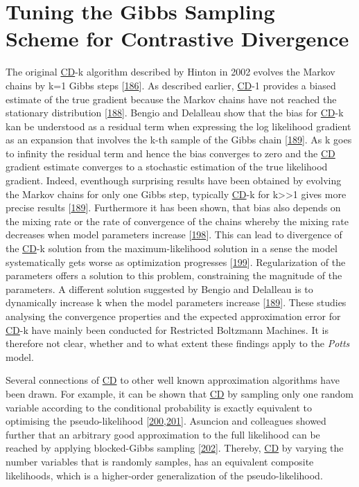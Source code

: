 \documentclass[11pt,a4paper,twoside]{book}
\theoremstyle{definition}
\theoremstyle{definition}
\theoremstyle{remark}
\begin{document}
\section{Tuning the Gibbs Sampling Scheme for Contrastive
Divergence}\label{cd-sampling-optimization}

The original \protect\hyperlink{abbrev}{CD}-k algorithm described by
Hinton in 2002 evolves the Markov chains by k=1 Gibbs steps
{[}\protect\hyperlink{ref-Hinton2002}{186}{]}. As described earlier,
\protect\hyperlink{abbrev}{CD}-1 provides a biased estimate of the true
gradient because the Markov chains have not reached the stationary
distribution {[}\protect\hyperlink{ref-Fischer2012}{188}{]}. Bengio and
Delalleau show that the bias for \protect\hyperlink{abbrev}{CD}-k kan be
understood as a residual term when expressing the log likelihood
gradient as an expansion that involves the k-th sample of the Gibbs
chain {[}\protect\hyperlink{ref-Bengio2009}{189}{]}. As k goes to
infinity the residual term and hence the bias converges to zero and the
\protect\hyperlink{abbrev}{CD} gradient estimate converges to a
stochastic estimation of the true likelihood gradient. Indeed,
eventhough surprising results have been obtained by evolving the Markov
chains for only one Gibbs step, typically
\protect\hyperlink{abbrev}{CD}-k for k\textgreater{}\textgreater{}1
gives more precise results
{[}\protect\hyperlink{ref-Bengio2009}{189}{]}. Furthermore it has been
shown, that bias also depends on the mixing rate or the rate of
convergence of the chains whereby the mixing rate decreases when model
parameters increase {[}\protect\hyperlink{ref-Tieleman2008}{198}{]}.
This can lead to divergence of the \protect\hyperlink{abbrev}{CD}-k
solution from the maximum-likelihood solution in a sense the model
systematically gets worse as optimization progresses
{[}\protect\hyperlink{ref-Fischer2010}{199}{]}. Regularization of the
parameters offers a solution to this problem, constraining the magnitude
of the parameters. A different solution suggested by Bengio and
Delalleau is to dynamically increase k when the model parameters
increase {[}\protect\hyperlink{ref-Bengio2009}{189}{]}. These studies
analysing the convergence properties and the expected approximation
error for \protect\hyperlink{abbrev}{CD}-k have mainly been conducted
for Restricted Boltzmann Machines. It is therefore not clear, whether
and to what extent these findings apply to the \emph{Potts} model.

Several connections of \protect\hyperlink{abbrev}{CD} to other well
known approximation algorithms have been drawn. For example, it can be
shown that \protect\hyperlink{abbrev}{CD} by sampling only one random
variable according to the conditional probability is exactly equivalent
to optimising the pseudo-likelihood
{[}\protect\hyperlink{ref-Hyvarinen2006}{200},\protect\hyperlink{ref-Hyvarinen2007}{201}{]}.
Asuncion and colleagues showed further that an arbitrary good
approximation to the full likelihood can be reached by applying
blocked-Gibbs sampling {[}\protect\hyperlink{ref-Asuncion2010}{202}{]}.
Thereby, \protect\hyperlink{abbrev}{CD} by varying the number variables
that is randomly samples, has an equivalent composite likelihoods, which
is a higher-order generalization of the pseudo-likelihood.
\end{document}
